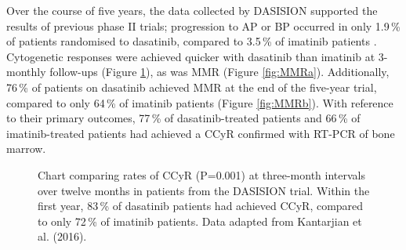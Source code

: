 Over the course of five years, the data collected by DASISION supported the results of previous phase II trials; progression to AP or BP occurred in only 1.9\,\% of patients randomised to dasatinib, compared to 3.5\,\% of imatinib patients \citep{RefWorks:doc:58564bd8e4b0f87b6b283223}. Cytogenetic responses were achieved quicker with dasatinib than imatinib at 3-monthly follow-ups (Figure \ref{fig:CCyR}), as was MMR (Figure \ref{fig:MMRa}). Additionally, 76\,\% of patients on dasatinib achieved MMR at the end of the five-year trial, compared to only 64\,\% of imatinib patients (Figure \ref{fig:MMRb}). With reference to their primary outcomes, 77\,\% of dasatinib-treated patients and 66\,\% of imatinib-treated patients had achieved a CCyR confirmed with RT-PCR of bone marrow.

\begin{figure}
\centering
{}

\caption{Chart comparing rates of CCyR (P=0.001) at three-month intervals over twelve months in patients from the DASISION trial. Within the first year, 83\,\% of dasatinib patients had achieved CCyR, compared to only 72\,\% of imatinib patients. Data adapted from Kantarjian et al. (2016).}
\label{fig:CCyR}
\end{figure}

